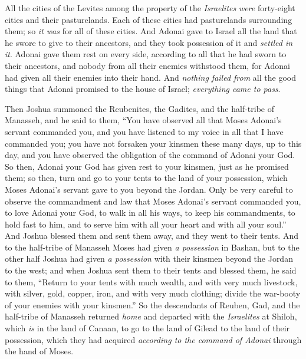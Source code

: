 \begin{biblechapter}
\verse All the cities of the Levites among the property of the \textit{Israelites} \textit{were} forty-eight cities and their pasturelands.
\verse Each of these cities had pasturelands surrounding them; so \textit{it was} for all of these cities.
\verse And Adonai gave to Israel all the land that he swore to give to their ancestors, and they took possession of it and \textit{settled in it}.
\verse Adonai gave them rest on every side, according to all that he had sworn to their ancestors, and nobody from all their enemies withstood them, for Adonai had given all their enemies into their hand.
\verse And \textit{nothing failed from} all the good things that Adonai promised to the house of Israel; \textit{everything came to pass}.
\end{biblechapter}

\begin{biblechapter} %
 Then Joshua summoned the Reubenites, the Gadites, and the half-tribe of Manasseh,
\verse and he said to them, “You have observed all that Moses Adonai’s servant commanded you, and you have listened to my voice in all that I have commanded you;
\verse you have not forsaken your kinsmen these many days, up to this day, and you have observed the obligation of the command of Adonai your God.
\verse So then, Adonai your God has given rest to your kinsmen, just as he promised them; so then, turn and go to your tents to the land of your possession, which Moses Adonai’s servant gave to you beyond the Jordan.
\verse Only be very careful to observe the commandment and law that Moses Adonai’s servant commanded you, to love Adonai your God, to walk in all his ways, to keep his commandments, to hold fast to him, and to serve him with all your heart and with all your soul.”
\verse And Joshua blessed them and sent them away, and they went to their tents.
\verse And to the half-tribe of Manasseh Moses had given \textit{a possession} in Bashan, but to the other half Joshua had given \textit{a possession} with their kinsmen beyond the Jordan to the west; and when Joshua sent them to their tents and blessed them,
\verse he said to them, “Return to your tents with much wealth, and with very much livestock, with silver, gold, copper, iron, and with very much clothing; divide the war-booty of your enemies with your kinsmen.”
\verse So the descendants of Reuben, Gad, and the half-tribe of Manasseh returned \textit{home} and departed with the \textit{Israelites} at Shiloh, which \textit{is} in the land of Canaan, to go to the land of Gilead to the land of their possession, which they had acquired \textit{according to the command of Adonai} through the hand of Moses.

\end{biblechapter}
